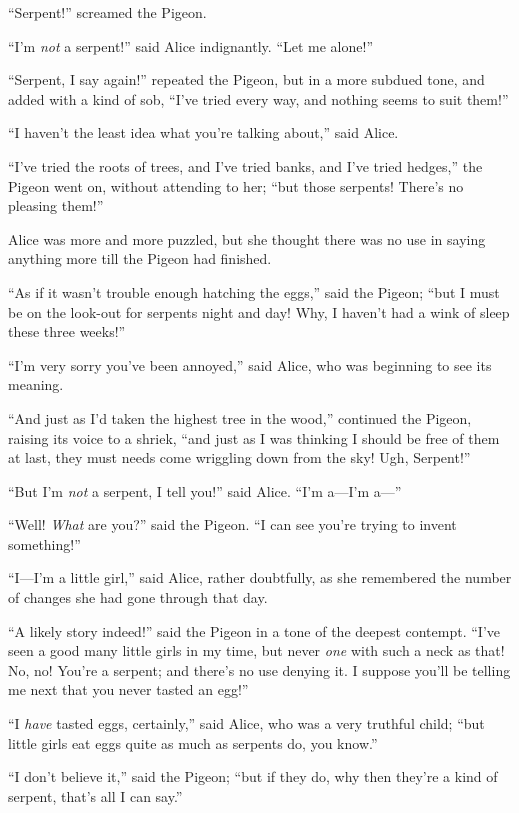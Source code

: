 \documentclass[book, 20pt]{extbook}
\begin{document}
``Serpent!'' screamed the Pigeon.

``I'm \emph{not} a serpent!'' said Alice indignantly. ``Let me alone!''

``Serpent, I say again!'' repeated the Pigeon, but in a more subdued
tone, and added with a kind of sob, ``I've tried every way, and nothing
seems to suit them!''

``I haven't the least idea what you're talking about,'' said Alice.

``I've tried the roots of trees, and I've tried banks, and I've tried
hedges,'' the Pigeon went on, without attending to her; ``but those
serpents! There's no pleasing them!''

Alice was more and more puzzled, but she thought there was no use in
saying anything more till the Pigeon had finished.

``As if it wasn't trouble enough hatching the eggs,'' said the Pigeon;
``but I must be on the look-out for serpents night and day! Why, I
haven't had a wink of sleep these three weeks!''

``I'm very sorry you've been annoyed,'' said Alice, who was beginning to
see its meaning.

``And just as I'd taken the highest tree in the wood,'' continued the
Pigeon, raising its voice to a shriek, ``and just as I was thinking I
should be free of them at last, they must needs come wriggling down from
the sky! Ugh, Serpent!''

``But I'm \emph{not} a serpent, I tell you!'' said Alice. ``I'm a---I'm
a---''

``Well! \emph{What} are you?'' said the Pigeon. ``I can see you're
trying to invent something!''

``I---I'm a little girl,'' said Alice, rather doubtfully, as she
remembered the number of changes she had gone through that day.

``A likely story indeed!'' said the Pigeon in a tone of the deepest
contempt. ``I've seen a good many little girls in my time, but never
\emph{one} with such a neck as that! No, no! You're a serpent; and
there's no use denying it. I suppose you'll be telling me next that you
never tasted an egg!''

``I \emph{have} tasted eggs, certainly,'' said Alice, who was a very
truthful child; ``but little girls eat eggs quite as much as serpents
do, you know.''

``I don't believe it,'' said the Pigeon; ``but if they do, why then
they're a kind of serpent, that's all I can say.''
\end{document}
